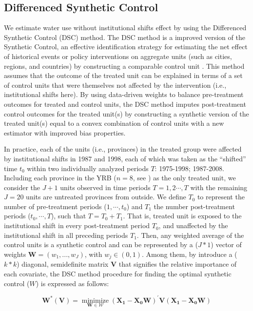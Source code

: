 \subsection{Differenced Synthetic Control}
We estimate water use without institutional shifts effect by using the Differenced Synthetic Control (DSC) method.
The DSC method is a improved version of the Synthetic Control, an effective identification strategy for estimating the net effect of historical events or policy interventions on aggregate units (such as cities, regions, and countries) by constructing a comparable control unit \cite{abadie2010, abadie2015, hill2021}.
This method assumes that the outcome of the treated unit can be explained in terms of a set of control units that were themselves not affected by the intervention (i.e., institutional shifts here).
By using data-driven weights to balance pre-treatment outcomes for treated and control units, the DSC method imputes post-treatment control outcomes for the treated unit(s) by constructing a synthetic version of the treated unit(s) equal to a convex combination of control units with a new estimator with improved bias properties.

In practice, each of the units (i.e., provinces) in the treated group were affected by institutional shifts in 1987 and 1998, each of which was taken as the ``shifted'' time $t_0$ within two individually analyzed periods $T$: 1975-1998; 1987-2008.
Including each province in the YRB ($n=8$, see \textit{}) as the only treated unit, we consider the $J+1$ units observed in time periods $T = {1,2 \cdots , T}$ with the remaining $J=20$ units are untreated provinces from outside.
We define $T_0$ to represent the number of pre-treatment periods ($1,\cdots,t_0$) and $T_1$ the number post-treatment periods ($t_0,\cdots,T$), such that $T = T_0+ T_1$.
That is, treated unit is exposed to the institutional shift in every post-treatment period $T_0$, and unaffected by the institutional shift in all preceding periods $T_1$.
Then, any weighted average of the control units is a synthetic control and can be represented by a ($J * 1$) vector of weights $\mathbf{W} = (w_{1},...,w_{J})$, with $w_j \in (0, 1)$.
Among them, by introduce a ($k * k$) diagonal, semidefinite matrix $\mathbf{V}$ that signifies the relative importance of each covariate, the DSC method procedure for finding the optimal synthetic control ($W$) is expressed as follows:

\begin{equation}
    \mathbf{W^{*}(V)}=\underset{\mathbf{W} \in \mathcal{W}}{\operatorname{minimize}}\left(\mathbf{X}_{\mathbf{1}}-\mathbf{X}_{\mathbf{0}} \mathbf{W}\right)^{\prime} \mathbf{V}\left(\mathbf{X}_{\mathbf{1}}-\mathbf{X}_{\mathbf{0}} \mathbf{W}\right)
\end{equation}

